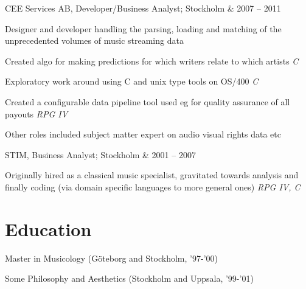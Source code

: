 \documentclass[letterpaper]{scrartcl}
\begin{document}
\begin{list1}
\item \begin{tabular1bold} CEE Services AB, Developer/Business Analyst; Stockholm & 2007 -- 2011 \end{tabular1bold}

  \begin{list2}
    \item Designer and developer handling the parsing, loading and matching of the unprecedented volumes of music streaming data
    \begin{list3}
      \item Created algo for making predictions for which writers relate to which artists \hfill \emph{C}
      \item Exploratory work around using C and unix type tools on OS/400 \hfill \emph{C}
    \end{list3}
    \item Created a configurable data pipeline tool used eg for quality assurance of all payouts \hfill \emph{RPG IV}
    \item Other roles included subject matter expert on audio visual rights data etc
  \end{list2}

\item \begin{tabular1bold} STIM, Business Analyst; Stockholm & 2001 -- 2007 \end{tabular1bold}

  \begin{list2}
  \item Originally hired as a classical music specialist, gravitated towards analysis and finally coding (via domain specific languages to more general ones)  \hfill \emph{RPG IV, C}
  \end{list2}


\end{list1}

\section*{Education}
\begin{list1}
\item
  \begin{tabular1bold}Master in Musicology (Göteborg and Stockholm, '97-'00)\end{tabular1bold}
  \begin{tabular1bold}Some Philosophy and Aesthetics (Stockholm and Uppsala, '99-'01)\end{tabular1bold}
\end{list1}
\end{document}
